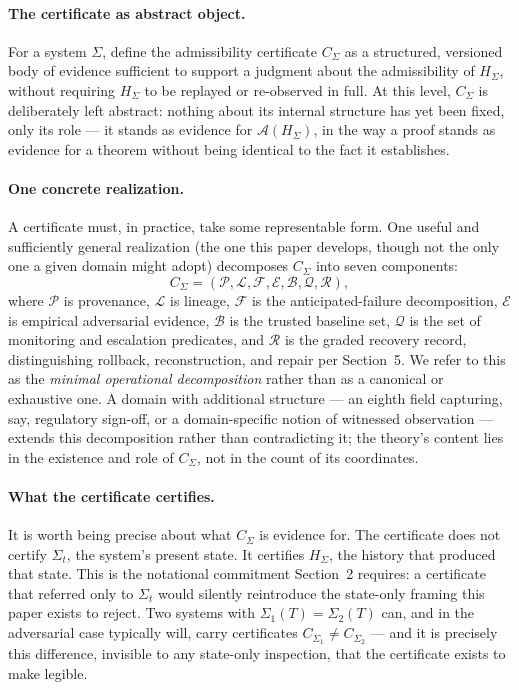 \documentclass[11pt]{article}
\begin{document}
\paragraph{The certificate as abstract object.} For a system $\Sigma$, define the admissibility certificate $C_\Sigma$ as a structured, versioned body of evidence sufficient to support a judgment about the admissibility of $H_\Sigma$, without requiring $H_\Sigma$ to be replayed or re-observed in full. At this level, $C_\Sigma$ is deliberately left abstract: nothing about its internal structure has yet been fixed, only its role --- it stands as evidence for $\mathcal{A}(H_\Sigma)$, in the way a proof stands as evidence for a theorem without being identical to the fact it establishes.

\paragraph{One concrete realization.} A certificate must, in practice, take some representable form. One useful and sufficiently general realization (the one this paper develops, though not the only one a given domain might adopt) decomposes $C_\Sigma$ into seven components:
\begin{equation}
C_\Sigma = (\mathcal{P}, \mathcal{L}, \mathcal{F}, \mathcal{E}, \mathcal{B}, \mathcal{Q}, \mathcal{R}),
\end{equation}
where $\mathcal{P}$ is provenance, $\mathcal{L}$ is lineage, $\mathcal{F}$ is the anticipated-failure decomposition, $\mathcal{E}$ is empirical adversarial evidence, $\mathcal{B}$ is the trusted baseline set, $\mathcal{Q}$ is the set of monitoring and escalation predicates, and $\mathcal{R}$ is the graded recovery record, distinguishing rollback, reconstruction, and repair per Section~5. We refer to this as the \emph{minimal operational decomposition} rather than as a canonical or exhaustive one. A domain with additional structure --- an eighth field capturing, say, regulatory sign-off, or a domain-specific notion of witnessed observation --- extends this decomposition rather than contradicting it; the theory's content lies in the existence and role of $C_\Sigma$, not in the count of its coordinates.

\paragraph{What the certificate certifies.} It is worth being precise about what $C_\Sigma$ is evidence for. The certificate does not certify $\Sigma_t$, the system's present state. It certifies $H_\Sigma$, the history that produced that state. This is the notational commitment Section~2 requires: a certificate that referred only to $\Sigma_t$ would silently reintroduce the state-only framing this paper exists to reject. Two systems with $\Sigma_1(T) = \Sigma_2(T)$ can, and in the adversarial case typically will, carry certificates $C_{\Sigma_1} \neq C_{\Sigma_2}$ --- and it is precisely this difference, invisible to any state-only inspection, that the certificate exists to make legible.
\end{document}
